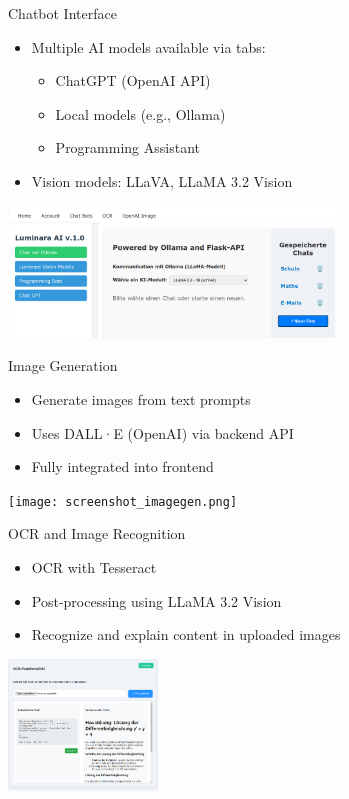 \documentclass{beamer}
\begin{document}
\begin{frame}{Chatbot Interface}
  \begin{itemize}
    \item Multiple AI models available via tabs:
    \begin{itemize}
      \item ChatGPT (OpenAI API)
      \item Local models (e.g., Ollama)
      \item Programming Assistant
    \end{itemize}
    \item Vision models: LLaVA, LLaMA 3.2 Vision
  \end{itemize}
  \vspace{0.5cm}
  \centering
  \includegraphics[height=3.5cm]{Chat-Bot-Navigation-Bar.png} %
\end{frame}

\begin{frame}{Image Generation}
  \begin{itemize}
    \item Generate images from text prompts
    \item Uses DALL·E (OpenAI) via backend API
    \item Fully integrated into frontend
  \end{itemize}
  \vspace{0.5cm}
  \centering
  \texttt{[image: screenshot\_imagegen.png]} %
\end{frame}

\begin{frame}{OCR and Image Recognition}
  \begin{itemize}
    \item OCR with Tesseract
    \item Post-processing using LLaMA 3.2 Vision
    \item Recognize and explain content in uploaded images
  \end{itemize}
  \vspace{0.5cm}
  \centering
  \includegraphics[height=3.5cm]{OCR-functonalatie.png} %
\end{frame}
\end{document}
